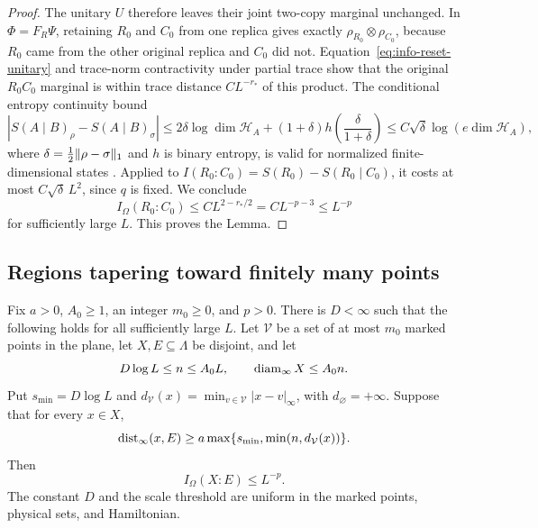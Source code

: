 \begin{proof}
The unitary $U$ therefore leaves their joint two-copy marginal unchanged.
In $\Phi=F_R\Psi$, retaining $R_0$ and $C_0$ from one replica gives
exactly $\rho_{R_0}\otimes\rho_{C_0}$, because $R_0$ came from the
other original replica and $C_0$ did not.  Equation~\eqref{eq:info-reset-unitary}
and trace-norm contractivity under partial trace show that the original
$R_0C_0$ marginal is within trace distance $CL^{-r_*}$ of this product.
The conditional entropy continuity bound
\[
 |S(A\mid B)_\rho-S(A\mid B)_\sigma|
 \le 2\delta\log\dim\mathcal H_A
       +(1+\delta)h\left(\frac{\delta}{1+\delta}\right)
 \le C\sqrt\delta\log(e\dim\mathcal H_A),
\]
where $\delta=\tfrac12\lVert \rho-\sigma\rVert_1$ and $h$ is binary entropy,
is valid for normalized finite-dimensional states
\cite{Winter2016}.  Applied to $I(R_0:C_0)=S(R_0)-S(R_0\mid C_0)$,
it costs at most $C\sqrt\delta\,L^2$, since $q$ is fixed.  We conclude
\[
 I_\Omega(R_0:C_0)\le CL^{2-r_*/2}=CL^{-p-3}\le L^{-p}
\]
for sufficiently large $L$.  This proves the Lemma.
\end{proof}

\subsection{Regions tapering toward finitely many points}

\begin{proposition}
\label{prop:angular}
Fix $a>0$, $A_0\ge1$, an integer $m_0\ge0$, and $p>0$.
There is $D<\infty$ such that the following holds for all sufficiently
large $L$.  Let $\mathcal V$ be a set of at most $m_0$ marked points
in the plane, let $X,E\subseteq\Lambda$ be disjoint, and let
\[
 D\log L\le n\le A_0L,
 \qquad \operatorname{diam}_\infty X\le A_0n.
\]
Put $s_{\min}=D\log L$ and
$d_{\mathcal V}(x)=\min_{v\in\mathcal V}|x-v|_\infty$, with
$d_{\varnothing}=+\infty$.  Suppose that for every $x\in X$,
\begin{equation}
 \operatorname{dist}_\infty(x,E)
   \ge a\max\{s_{\min},\min(n,d_{\mathcal V}(x))\}.
 \label{eq:info-angular-separation}
\end{equation}
Then
\[
 I_\Omega(X:E)\le L^{-p}.
\]
The constant $D$ and the scale threshold are uniform in the marked
points, physical sets, and Hamiltonian.
\end{proposition}

